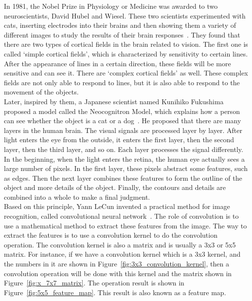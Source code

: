 In 1981, the Nobel Prize in Physiology or Medicine was awarded to two neuroscientists, David Hubel and Wiesel. These two scientists experimented with cats, inserting electrodes into their brains and then showing them a variety of different images to study the results of their brain responses~\cite{hubel1962receptive}. They found that there are two types of cortical fields in the brain related to vision. The first one is called `simple cortical fields', which is characterized by sensitivity to certain lines. After the appearance of lines in a certain direction, these fields will be more sensitive and can see it. There are `complex cortical fields' as well. These complex fields are not only able to respond to lines, but it is also able to respond to the movement of the objects.\\


Later, inspired by them, a Japanese scientist named Kunihiko Fukushima proposed a model called the Neocognitron Model, which explains how a person can see whether the object is a cat or a dog~\cite{fukushima1982neocognitron}. He proposed that there are many layers in the human brain. The visual signals are processed layer by layer. After light enters the eye from the outside, it enters the first layer, then the second layer, then the third layer, and so on. Each layer processes the signal differently. In the beginning, when the light enters the retina, the human eye actually sees a large number of pixels. In the first layer, these pixels abstract some features, such as edges. Then the next layer combines these features to form the outline of the object and more details of the object. Finally, the contours and details are combined into a whole to make a final judgment.\\


Based on this principle, Yann LeCun invented a practical method for image recognition, called convolutional neural network~\cite{lecun1995convolutional}. The role of convolution is to use a mathematical method to extract these features from the image. The way to extract the features is to use a convolution kernel to do the convolution operation. The convolution kernel is also a matrix and is usually a 3x3 or 5x5 matrix. For instance, if we have a convolution kernel which is a 3x3 kernel, and the numbers in it are shown in Figure~\ref{fig:3x3_convolution_kernel}, then a convolution operation will be done with this kernel and the matrix shown in Figure~\ref{fig:x_7x7_matrix}. The operation result is shown in Figure~\ref{fig:5x5_feature_map}. This result is also known as a feature map.\\


